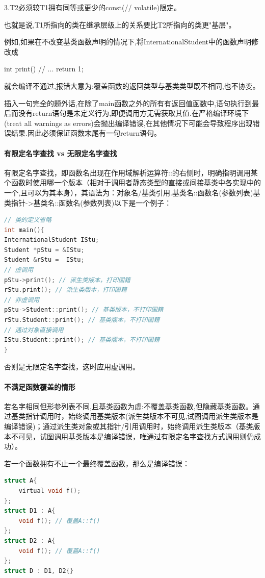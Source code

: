 \documentclass[UTF8]{ctexart}
\begin{document}
3.T2必须较T1拥有同等或更少的const(// volatile)限定。

也就是说,T1所指向的类在继承层级上的关系要比T2所指向的类更"基层"。

例如,如果在不改变基类函数声明的情况下,将InternationalStudent中的函数声明修改成

int print(){    // ...    return 1;}

就会编译不通过,报错大意为:覆盖函数的返回类型与基类类型既不相同,也不协变。

插入一句完全的题外话,在除了main函数之外的所有有返回值函数中,语句执行到最后而没有return语句是未定义行为,即便调用方无需获取其值.在严格编译环境下(treat all warnings as errors)会抛出编译错误,在其他情况下可能会导致程序出现错误结果.因此必须保证函数末尾有一句return语句。

\paragraph{有限定名字查找 vs 无限定名字查找}
有限定名字查找，即函数名出现在作用域解析运算符::的右侧时，明确指明调用某个函数时使用哪一个版本（相对于调用者静态类型的直接或间接基类中各实现中的一个,且可以为其本身），其语法为：对象名/基类引用.基类名::函数名(参数列表)基类指针->基类名::函数名(参数列表)以下是一个例子：

\begin{lstlisting}[language = C,basicstyle=\small\ttfamily]
// 类的定义省略
int main(){   
InternationalStudent IStu;    
Student *pStu = &IStu;    
Student &rStu =  IStu;
// 虚调用    
pStu->print(); // 派生类版本，打印国籍    
rStu.print(); // 派生类版本，打印国籍
// 非虚调用    
pStu->Student::print(); // 基类版本，不打印国籍   
rStu.Student::print(); // 基类版本，不打印国籍
// 通过对象直接调用    
IStu.Student::print(); // 基类版本，不打印国籍
}
\end{lstlisting}

否则是无限定名字查找，这时应用虚调用。

\paragraph{不满足函数覆盖的情形}
若名字相同但形参列表不同,且基类函数为虚:不覆盖基类函数,但隐藏基类函数。通过基类指针调用时，始终调用基类版本(派生类版本不可见,试图调用派生类版本是编译错误)；通过派生类对象或其指针/引用调用时，始终调用派生类版本（基类版本不可见，试图调用基类版本是编译错误，唯通过有限定名字查找方式调用则仍成功）。

若一个函数拥有不止一个最终覆盖函数，那么是编译错误：
\begin{lstlisting}[language = C,basicstyle=\small\ttfamily]
struct A{   
    virtual void f();
};
struct D1 : A{    
    void f(); // 覆盖A::f()
};
struct D2 : A{    
    void f(); // 覆蓋A::f()
};
struct D : D1, D2{}
\end{lstlisting}
\end{document}
